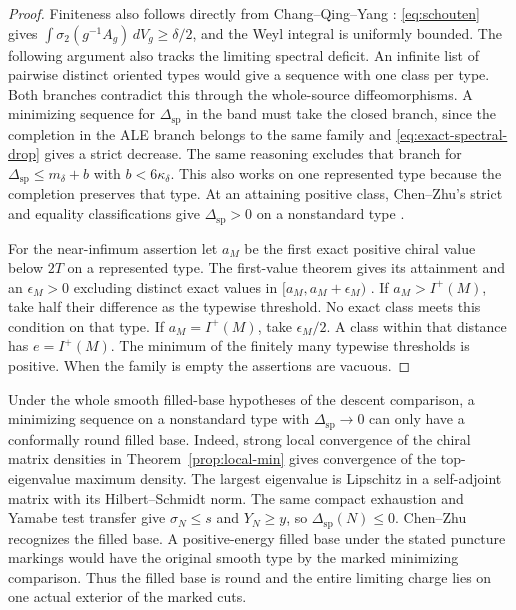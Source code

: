 \begin{proof}
Finiteness also follows directly from Chang--Qing--Yang
\cite[Theorem B]{ChangQingYang2006Gap}: \eqref{eq:schouten} gives
\(\int\sigma_2(g^{-1}A_g)\,dV_g\ge\delta/2\), and the Weyl integral
is uniformly bounded. The following argument also tracks the limiting
spectral deficit. An infinite list of pairwise distinct oriented types would give
a sequence with one class per type. Both branches contradict
this through the whole-source diffeomorphisms. A minimizing
sequence for \(\Delta_{\mathrm{sp}}\) in the band must take the
closed branch, since the completion in the ALE branch belongs
to the same family and \eqref{eq:exact-spectral-drop} gives a
strict decrease. The same reasoning excludes that branch for
\(\Delta_{\mathrm{sp}}\le m_\delta+b\) with \(b<6\kappa_\delta\).
This also works on one represented type because the completion
preserves that type. At an attaining positive class, Chen--Zhu's
strict and equality classifications give
\(\Delta_{\mathrm{sp}}>0\) on a nonstandard type
\cite[Theorems~1.4 and 1.6]{ChenZhu2014Conformal}.

For the near-infimum assertion let \(a_M\) be the first exact
positive chiral value below \(2T\) on a represented type.
The first-value theorem gives its attainment and an
\(\epsilon_M>0\) excluding distinct exact values in
\([a_M,a_M+\epsilon_M)\)
\cite[First fixed-type critical value]{Baker2026MarkedNecks}.
If \(a_M>I^+(M)\), take half their difference as the typewise
threshold. No exact class meets this condition on that type.
If \(a_M=I^+(M)\), take \(\epsilon_M/2\). A class within that
distance has \(e=I^+(M)\). The minimum of the finitely many
typewise thresholds is positive. When the family is empty
the assertions are vacuous.
\end{proof}

Under the whole smooth filled-base hypotheses of the descent
comparison, a minimizing sequence on a nonstandard type with
\(\Delta_{\mathrm{sp}}\to0\) can only have a conformally round
filled base. Indeed, strong local convergence of the chiral
matrix densities in Theorem~\ref{prop:local-min} gives
convergence of the top-eigenvalue maximum density. The largest
eigenvalue is Lipschitz in a self-adjoint matrix with its
Hilbert--Schmidt norm. The same compact exhaustion and Yamabe
test transfer give \(\sigma_N\le s\) and \(Y_N\ge y\), so
\(\Delta_{\mathrm{sp}}(N)\le0\). Chen--Zhu recognizes the filled
base. A positive-energy filled base under the stated puncture
markings would have the original smooth type by the marked
minimizing comparison. Thus the filled base is round and the
entire limiting charge lies on one actual exterior of the
marked cuts.

